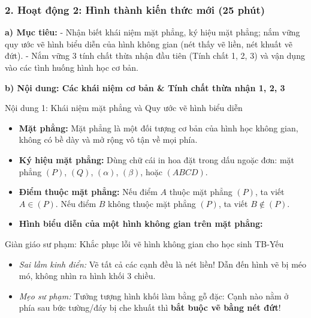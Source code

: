 \documentclass[12pt, a4paper]{article}
\begin{document}
\subsubsection*{2. Hoạt động 2: Hình thành kiến thức mới (25 phút)}

\noindent \textbf{a) Mục tiêu:}
- Nhận biết khái niệm mặt phẳng, ký hiệu mặt phẳng; nắm vững quy ước vẽ hình biểu diễn của hình không gian (nét thấy vẽ liền, nét khuất vẽ đứt).
- Nắm vững 3 tính chất thừa nhận đầu tiên (Tính chất 1, 2, 3) và vận dụng vào các tình huống hình học cơ bản.

\noindent \textbf{b) Nội dung: Các khái niệm cơ bản \& Tính chất thừa nhận 1, 2, 3}
\begin{pedabox}{Nội dung 1: Khái niệm mặt phẳng và Quy ước vẽ hình biểu diễn}
\begin{itemize}[leftmargin=0.6cm]
    \item \textbf{Mặt phẳng:} Mặt phẳng là một đối tượng cơ bản của hình học không gian, không có bề dày và mở rộng vô tận về mọi phía.
    \item \textbf{Ký hiệu mặt phẳng:} Dùng chữ cái in hoa đặt trong dấu ngoặc đơn: mặt phẳng $(P)$, $(Q)$, $(\alpha)$, $(\beta)$, hoặc $(ABCD)$.
    \item \textbf{Điểm thuộc mặt phẳng:} Nếu điểm $A$ thuộc mặt phẳng $(P)$, ta viết $A \in (P)$. Nếu điểm $B$ không thuộc mặt phẳng $(P)$, ta viết $B \notin (P)$.
    \item \textbf{Hình biểu diễn của một hình không gian trên mặt phẳng:}
\end{itemize}
\end{pedabox}

\begin{scaffoldbox}{Giàn giáo sư phạm: Khắc phục lỗi vẽ hình không gian cho học sinh TB-Yếu}
\begin{itemize}[leftmargin=0.6cm]
    \item \textit{Sai lầm kinh điển:} Vẽ tất cả các cạnh đều là nét liền! Dẫn đến hình vẽ bị méo mó, không nhìn ra hình khối 3 chiều.
    \item \textit{Mẹo sư phạm:} Tưởng tượng hình khối làm bằng gỗ đặc: Cạnh nào nằm ở phía sau bức tường/đáy bị che khuất thì \textbf{bắt buộc vẽ bằng nét đứt}!
\end{itemize}
\end{scaffoldbox}
\end{document}

